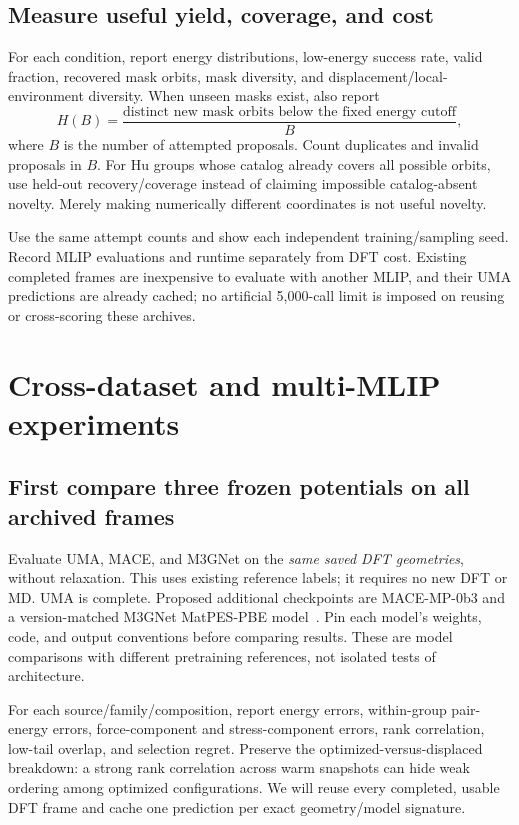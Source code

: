 \subsection*{Measure useful yield, coverage, and cost}
For each condition, report energy distributions, low-energy success rate, valid fraction, recovered mask orbits, mask diversity, and displacement/local-environment diversity. When unseen masks exist, also report
\[
 H(B)=\frac{\text{distinct new mask orbits below the fixed energy cutoff}}{B},
\]
where $B$ is the number of attempted proposals. Count duplicates and invalid proposals in $B$. For Hu groups whose catalog already covers all possible orbits, use held-out recovery/coverage instead of claiming impossible catalog-absent novelty. Merely making numerically different coordinates is not useful novelty.

Use the same attempt counts and show each independent training/sampling seed. Record MLIP evaluations and runtime separately from DFT cost. Existing completed frames are inexpensive to evaluate with another MLIP, and their UMA predictions are already cached; no artificial 5,000-call limit is imposed on reusing or cross-scoring these archives.

\clearpage
\section{Cross-dataset and multi-MLIP experiments}\label{sec:transfer}

\subsection*{First compare three frozen potentials on all archived frames}
Evaluate UMA, MACE, and M3GNet on the \emph{same saved DFT geometries}, without relaxation. This uses existing reference labels; it requires no new DFT or MD. UMA is complete. Proposed additional checkpoints are MACE-MP-0b3 and a version-matched M3GNet MatPES-PBE model~\cite{mace,m3gnet}. Pin each model's weights, code, and output conventions before comparing results. These are model comparisons with different pretraining references, not isolated tests of architecture.

For each source/family/composition, report energy errors, within-group pair-energy errors, force-component and stress-component errors, rank correlation, low-tail overlap, and selection regret. Preserve the optimized-versus-displaced breakdown: a strong rank correlation across warm snapshots can hide weak ordering among optimized configurations. We will reuse every completed, usable DFT frame and cache one prediction per exact geometry/model signature.

